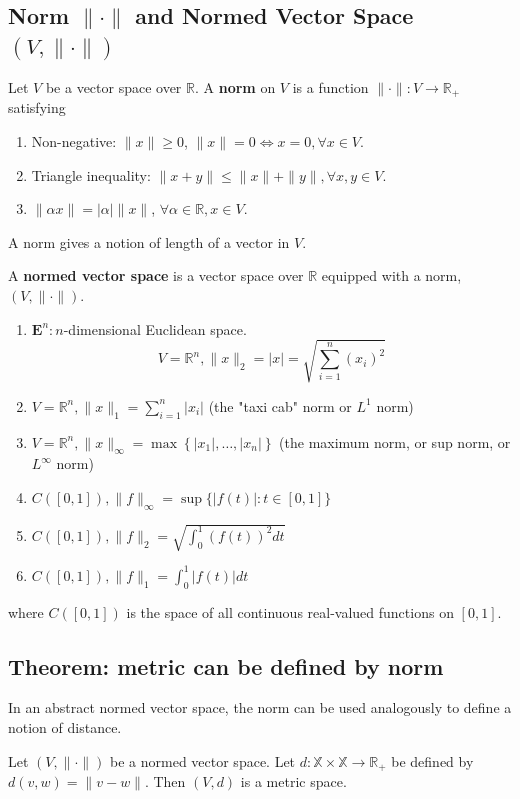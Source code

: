 \documentclass[11pt]{elegantbook}
\begin{document}
\subsection{Norm $\|\cdot\|$ and Normed Vector Space $(V,\|\cdot\|)$}
\begin{definition}[Norm]
\normalfont
    Let $V$ be a vector space over $\mathbb{R}$. A \textbf{norm} on $V$ is a function $\|\cdot\| : V \rightarrow \mathbb{R}_+$ satisfying
    \begin{enumerate}
        \item Non-negative: $\|x\|\geq 0$, $\|x\|=0\Leftrightarrow x=0, \forall x\in V$.
        \item Triangle inequality: $\|x+y\|\leq \|x\|+\|y\|, \forall x,y\in V$.
        \item $\|\alpha x\|=|\alpha|\|x\|$, $\forall \alpha\in \mathbb{R},x\in V$.
    \end{enumerate}
\end{definition}
A norm gives a notion of length of a vector in $V$.

\begin{definition}
\normalfont
    A \textbf{normed vector space} is a vector space over $\mathbb{R}$ equipped with a norm, $(V,\|\cdot\|)$.
\end{definition}
\begin{example}
\begin{enumerate}[-]
    \item $\mathbf{E}^n: n$-dimensional Euclidean space.
    $$
    V=\mathbb{R}^n,\|x\|_2=|x|=\sqrt{\sum_{i=1}^n\left(x_i\right)^2}
    $$
    \item $V=\mathbb{R}^n,\|x\|_1=\sum_{i=1}^n\left|x_i\right|$ (the "taxi cab" norm or $L^1$ norm)
    \item $V=\mathbb{R}^n,\|x\|_{\infty}=\max \left\{\left|x_1\right|, \ldots,\left|x_n\right|\right\}$ (the maximum norm, or sup norm, or $L^{\infty}$ norm)
    \item $C([0,1]),\|f\|_{\infty}=\sup \{|f(t)|: t \in[0,1]\}$
    \item $C([0,1]),\|f\|_2=\sqrt{\int_0^1(f(t))^2 d t}$
    \item $C([0,1]),\|f\|_1=\int_0^1|f(t)| d t$
\end{enumerate}
where $C([0,1])$ is the space of all continuous real-valued functions on $[0,1]$.
\end{example}

\subsection{Theorem: metric can be defined by norm}
In an abstract normed vector space, the norm can be used analogously to define a notion of distance.
\begin{theorem}
    Let $(V,\|\cdot\|)$ be a normed vector space. Let $d : \mathbb{X} \times \mathbb{X} \rightarrow \mathbb{R}_+$ be defined by $d(v, w) = \|v-w\|$. Then $(V, d)$ is a metric space.
\end{theorem}
\end{document}
